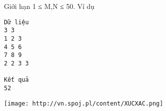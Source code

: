 Giới hạn
1 ≤ M,N ≤ 50.
Ví dụ
\begin{verbatim}
Dữ liệu
3 3
1 2 3
4 5 6
7 8 9
2 2 3 3

Kết quả
52
\end{verbatim}


\texttt{[image: http://vn.spoj.pl/content/XUCXAC.png]}